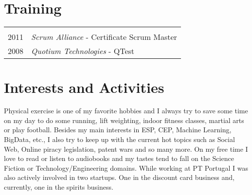 \documentclass[a4paper,10pt]{article}
\begin{document}
\section{Training}
\begin{tabular}{rl}
\multicolumn{2}{c}{} \\
 2011 & \emph{Scrum Alliance} - Certificate Scrum Master  \\
 2008 & \emph{Quotium Technologies} - QTest \\
\end{tabular}

\section{Interests and Activities}
Physical exercise is one of my favorite hobbies and I always try to save some time on my day to do some running, lift weighting, indoor fitness classes, martial arts or play football.
Besides my main interests in ESP, CEP, Machine Learning, BigData, etc., I also try to keep up with the current hot topics such as Social Web, Online piracy legislation, patent wars and
so many more.
On my free time I love to read or listen to audiobooks and my tastes tend to fall on the Science Fiction or Technology/Engineering domains.
While working at PT Portugal I was also actively involved in two startups. One in the discount card business and, currently, one in the spirits business.
\end{document}
